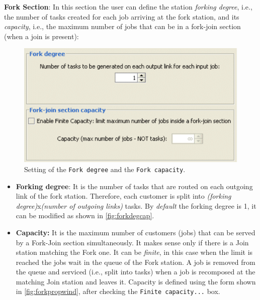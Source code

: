 \noindent \textbf{Fork Section}: In this section the user can
define the station \emph{forking degree}, i.e., the number of
tasks created for each job arriving at the fork station, and its
\emph{capacity}, i.e., the maximum number of jobs that can be in a
fork-join section (when a join is present):
\begin{figure}[htb]
    \begin{center}
        \includegraphics[scale=.5]{img/jsimg/8.21.eps}
    \end{center}
    \caption{Setting of the \texttt{Fork degree} and the \texttt{Fork capacity}.}
    \label{fig:forkdegcap}
\end{figure}
\begin{itemize}
\item \textbf{Forking degree}: It is the number of tasks that are
routed on each outgoing link of the fork station. Therefore, each
customer is split into \emph{(forking degree)}x\emph{(number of
outgoing links)} tasks. By \emph{default} the forking degree is 1,
it can be modified as shown in \autoref{fig:forkdegcap}. \item
\textbf{Capacity:} It is the maximum number of customers (jobs)
that can be served by a Fork-Join section simultaneously. It makes
sense only if there is a Join station matching the Fork one. It
can be \emph{finite}, in this case when the limit is reached the
jobs wait in the queue of the Fork station. A job is removed from
the queue and serviced (i.e., split into tasks) when a job is
recomposed at the matching Join station and leaves it. Capacity is
defined using the form shown in \autoref{fig:forkpropwind}, after
checking the \texttt{Finite capacity...} box.
\end{itemize}

